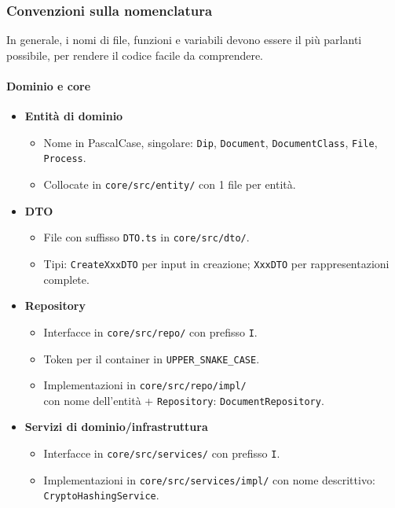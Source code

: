 \documentclass[a4paper,12pt]{article}
\begin{document}
\subsubsection{Convenzioni sulla nomenclatura}
In generale, i nomi di file, funzioni e variabili devono essere il più parlanti possibile, per rendere il codice facile da comprendere.

\paragraph{Dominio e core}

\begin{itemize}
  \item \textbf{Entità di dominio}
    \begin{itemize}
      \item Nome in PascalCase, singolare: \texttt{Dip}, \texttt{Document}, \texttt{DocumentClass}, \texttt{File}, \texttt{Process}.
      \item Collocate in \texttt{core/src/entity/} con 1 file per entità.
    \end{itemize}

  \item \textbf{DTO}
    \begin{itemize}
      \item File con suffisso \texttt{DTO.ts} in \texttt{core/src/dto/}.
      \item Tipi: \texttt{CreateXxxDTO} per input in creazione; \texttt{XxxDTO} per rappresentazioni complete.
    \end{itemize}

  \item \textbf{Repository}
    \begin{itemize}
      \item Interfacce in \texttt{core/src/repo/} con prefisso \texttt{I}.
      \item Token per il container in \texttt{UPPER\_SNAKE\_CASE}.
      \item Implementazioni in \texttt{core/src/repo/impl/}\\ con nome dell'entità + \texttt{Repository}: \texttt{DocumentRepository}.
    \end{itemize}

  \item \textbf{Servizi di dominio/infrastruttura}
    \begin{itemize}
      \item Interfacce in \texttt{core/src/services/} con prefisso \texttt{I}.
      \item Implementazioni in \texttt{core/src/services/impl/} con nome descrittivo: \texttt{CryptoHashingService}.
    \end{itemize}


\end{itemize}
\end{document}
